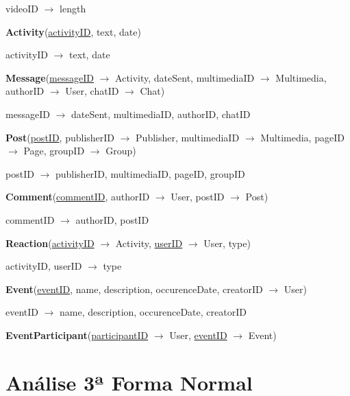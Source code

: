 \documentclass[12pt]{report}
\begin{document}
videoID $\rightarrow$ length

\vspace{2mm}

\textbf{Activity}(\underline{activityID}, text, date)

activityID $\rightarrow$ text, date

\vspace{2mm}

\textbf{Message}(\underline{messageID} $\rightarrow$ Activity, dateSent, multimediaID $\rightarrow$ Multimedia, authorID $\rightarrow$ User, chatID $\rightarrow$ Chat)

messageID $\rightarrow$ dateSent, multimediaID, authorID, chatID

\vspace{2mm}

\textbf{Post}(\underline{postID}, publisherID $\rightarrow$ Publisher, multimediaID $\rightarrow$ Multimedia, pageID $\rightarrow$ Page, groupID $\rightarrow$ Group)

postID $\rightarrow$ publisherID, multimediaID, pageID, groupID

\vspace{2mm}

\textbf{Comment}(\underline{commentID}, authorID $\rightarrow$ User, postID $\rightarrow$ Post)

commentID $\rightarrow$ authorID, postID

\vspace{2mm}

\textbf{Reaction}(\underline{activityID} $\rightarrow$ Activity, \underline{userID} $\rightarrow$ User, type)

activityID, userID $\rightarrow$ type

\vspace{2mm}

\textbf{Event}(\underline{eventID}, name, description, occurenceDate, creatorID $\rightarrow$ User)

eventID $\rightarrow$ name, description, occurenceDate, creatorID

\vspace{2mm}

\textbf{EventParticipant}(\underline{participantID} $\rightarrow$ User, \underline{eventID} $\rightarrow$ Event)

\section{Análise 3ª Forma Normal}
\end{document}
